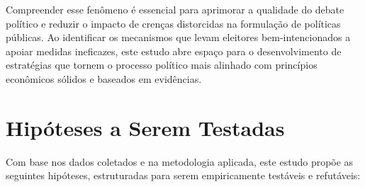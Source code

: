 Compreender esse fenômeno é essencial para aprimorar a qualidade do debate político e reduzir o impacto de crenças distorcidas na formulação de políticas públicas. Ao identificar os mecanismos que levam eleitores bem-intencionados a apoiar medidas ineficazes, este estudo abre espaço para o desenvolvimento de estratégias que tornem o processo político mais alinhado com princípios econômicos sólidos e baseados em evidências.  

\section{Hipóteses a Serem Testadas}

Com base nos dados coletados e na metodologia aplicada, este estudo propõe as seguintes hipóteses, estruturadas para serem empiricamente testáveis e refutáveis:

